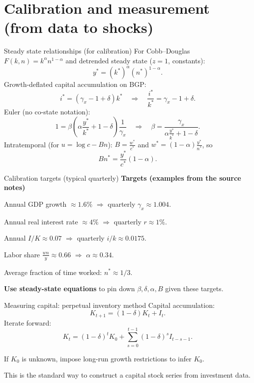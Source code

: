 \documentclass[aspectratio=169,xcolor=dvipsnames]{beamer}
\let\tempone\itemize
\let\temptwo\enditemize
\renewenvironment{itemize}{\tempone\addtolength{\itemsep}{\fill}}{\temptwo}
\begin{document}
\section[Calibration]{Calibration and measurement (from data to shocks)}

\begin{frame}{Steady state relationships (for calibration)}
\label{slide:BC_SteadyState}
\small
For Cobb--Douglas \(F(k,n)=k^{\alpha}n^{1-\alpha}\) and detrended steady state (\(z=1\), constants):
\[
 y^*=(k^*)^{\alpha}(n^*)^{1-\alpha}.
\]
Growth-deflated capital accumulation on BGP:
\[
 i^*=(\gamma_x-1+\delta)k^* \quad\Rightarrow\quad \frac{i^*}{k^*}=\gamma_x-1+\delta.
\]
Euler (no co-state notation):
\[
 1=\beta\left(\alpha\frac{y^*}{k^*}+1-\delta\right)\frac{1}{\gamma_x}
\quad\Rightarrow\quad
\beta=\frac{\gamma_x}{\alpha\frac{y^*}{k^*}+1-\delta}.
\]
Intratemporal (for \(u=\log c -Bn\)): \(B=\frac{w^*}{c^*}\) and \(w^*=(1-\alpha)\frac{y^*}{n^*}\), so
\[
B n^* = \frac{y^*}{c^*}(1-\alpha).
\]
\end{frame}

\begin{frame}{Calibration targets (typical quarterly)}
\label{slide:BC_Targets}
\small
\textbf{Targets (examples from the source notes)}
\begin{itemize}
    \item Annual GDP growth \(\approx 1.6\%\) \(\Rightarrow\) quarterly \(\gamma_x\approx 1.004\).
    \item Annual real interest rate \(\approx 4\%\) \(\Rightarrow\) quarterly \(r\approx 1\%\).
    \item Annual \(I/K\approx 0.07\) \(\Rightarrow\) quarterly \(i/k\approx 0.0175\).
    \item Labor share \(\frac{w n}{y}\approx 0.66\) \(\Rightarrow\) \(\alpha\approx 0.34\).
    \item Average fraction of time worked: \(n^*\approx 1/3\).
\end{itemize}

\vspace{0.4em}
\textbf{Use steady-state equations} to pin down \(\beta,\delta,\alpha,B\) given these targets.
\end{frame}

\begin{frame}{Measuring capital: perpetual inventory method}
\label{slide:BC_CapitalMeasure}
\small
Capital accumulation:
\[
K_{t+1}=(1-\delta)K_t+I_t.
\]
Iterate forward:
\[
K_t=(1-\delta)^t K_0 + \sum_{s=0}^{t-1}(1-\delta)^s I_{t-s-1}.
\]
\begin{itemize}
    \item If \(K_0\) is unknown, impose long-run growth restrictions to infer \(K_0\).
    \item This is the standard way to construct a capital stock series from investment data.
\end{itemize}
\end{frame}
\end{document}
